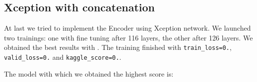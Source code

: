 \documentclass{article}
\begin{document}
			
		\subsection{Xception with concatenation}
			
			At last we tried to implement the Encoder using Xception network. We launched two trainings: one with fine tuning after 116 layers, the other after 126 layers. We obtained the best results with . The training finished with \texttt{train\_loss=0.}, \texttt{valid\_loss=0.} and \texttt{kaggle\_score=0.}.
			
	
			
			The model with which we obtained the highest score is: 
			
\end{document}
